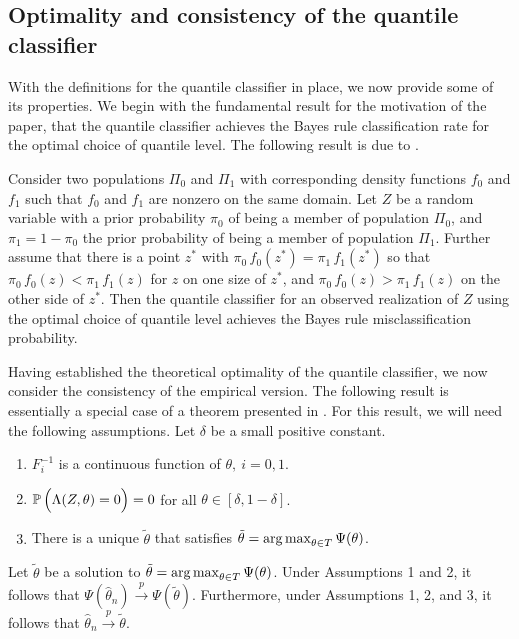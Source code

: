 \subsection{Optimality and consistency of the quantile classifier}
\label{sec:quantile-classifier-optimality}

With the definitions for the quantile classifier in place, we now provide some
of its properties.  We begin with the fundamental result for the motivation of
the paper, that the quantile classifier achieves the Bayes rule classification
rate for the optimal choice of quantile level.  The following result is due to
\cite{hennig2016}.

\begin{proposition}
  \label{thm:quantile-classifier-is-bayes}
  Consider two populations $\Pi_0$ and $\Pi_1$ with corresponding density
  functions $f_0$ and $f_1$ such that $f_0$ and $f_1$ are nonzero on the same
  domain.  Let $Z$ be a random variable with a prior probability $\pi_0$ of
  being a member of population $\Pi_0$, and $\pi_1 = 1 - \pi_0$ the prior
  probability of being a member of population $\Pi_1$.  Further assume that
  there is a point $z^{*}$ with $\pi_0\, f_0(z^{*}) = \pi_1\, f_1(z^{*})$ so
  that $\pi_0\, f_0(z) < \pi_1\, f_1(z)$ for $z$ on one size of $z^{*}$, and
  $\pi_0\, f_0(z) > \pi_1\, f_1(z)$ on the other side of $z^{*}$.  Then the
  quantile classifier for an observed realization of $Z$ using the optimal
  choice of quantile level achieves the Bayes rule misclassification
  probability.
\end{proposition}

Having established the theoretical optimality of the quantile classifier, we now
consider the consistency of the empirical version.  The following result is
essentially a special case of a theorem presented in \cite{hennig2016}.  For
this result, we will need the following assumptions.  Let $\delta$ be a small
positive constant.
\begin{enumerate}[label=\emph{Assumption \arabic*.}, align=left]
\item $F_i^{-1}$ is a continuous function of
  $\theta,~ i=0,1$.
\item $\mathbb{P}\,\Big( \Lambda(Z, \theta) = 0 \Big) = 0$ for all
  $\theta \in [\delta, 1 - \delta]$.
\item There is a unique $\tilde{\theta}$ that satisfies $\tilde{\theta} =
  \operatorname*{arg\,max}_{\theta \in T} \Psi(\theta)$.
\end{enumerate}

\begin{lemma}
  \label{lem:univariate-consistency}
  Let $\tilde{\theta}$ be a solution to
  $\tilde{\theta} = \operatorname*{arg\,max}_{\theta \in T} \Psi(\theta)$.  Under Assumptions 1
  and 2, it follows that
  $\Psi(\hat{\theta}_n) \stackrel{p}{\longrightarrow} \Psi(\tilde{\theta})$.
  Furthermore, under Assumptions 1, 2, and 3, it follows that
  $\hat{\theta}_n \stackrel{p}{\longrightarrow} \tilde{\theta}$.
\end{lemma}


